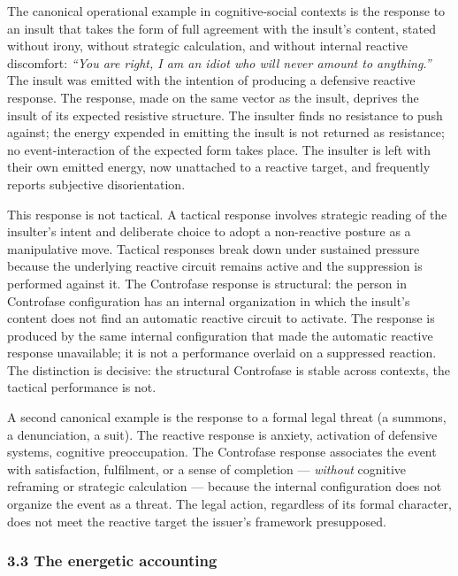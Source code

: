\documentclass[
  11pt,
  a4paper,
]{article}
\begin{document}
The canonical operational example in cognitive-social contexts is the
response to an insult that takes the form of full agreement with the
insult's content, stated without irony, without strategic calculation,
and without internal reactive discomfort: \emph{``You are right, I am an
idiot who will never amount to anything.''} The insult was emitted with
the intention of producing a defensive reactive response. The response,
made on the same vector as the insult, deprives the insult of its
expected resistive structure. The insulter finds no resistance to push
against; the energy expended in emitting the insult is not returned as
resistance; no event-interaction of the expected form takes place. The
insulter is left with their own emitted energy, now unattached to a
reactive target, and frequently reports subjective disorientation.

This response is not tactical. A tactical response involves strategic
reading of the insulter's intent and deliberate choice to adopt a
non-reactive posture as a manipulative move. Tactical responses break
down under sustained pressure because the underlying reactive circuit
remains active and the suppression is performed against it. The
Controfase response is structural: the person in Controfase
configuration has an internal organization in which the insult's content
does not find an automatic reactive circuit to activate. The response is
produced by the same internal configuration that made the automatic
reactive response unavailable; it is not a performance overlaid on a
suppressed reaction. The distinction is decisive: the structural
Controfase is stable across contexts, the tactical performance is not.

A second canonical example is the response to a formal legal threat (a
summons, a denunciation, a suit). The reactive response is anxiety,
activation of defensive systems, cognitive preoccupation. The Controfase
response associates the event with satisfaction, fulfilment, or a sense
of completion --- \emph{without} cognitive reframing or strategic
calculation --- because the internal configuration does not organize the
event as a threat. The legal action, regardless of its formal character,
does not meet the reactive target the issuer's framework presupposed.

\subsubsection{3.3 The energetic
accounting}\label{the-energetic-accounting}
\end{document}
